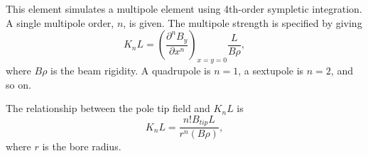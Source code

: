 \begin{raggedright}

This element simulates a multipole element using 4th-order sympletic
integration.  A single multipole order, $n$, is given.  The multipole
strength is specified by giving
\begin{equation}
K_n L = \left(\frac{\partial^n B_y}{\partial x^n}\right)_{x=y=0} \frac{L}{B\rho},
\end{equation}
where $B\rho$ is the beam rigidity.  A quadrupole is $n=1$, a sextupole is $n=2$,
and so on.

The relationship between the pole tip field and $K_n L$ is
\begin{equation}
K_n L = \frac{n! B_{tip} L}{r^n (B\rho)},
\end{equation}
where $r$ is the bore radius.

\end{raggedright}
